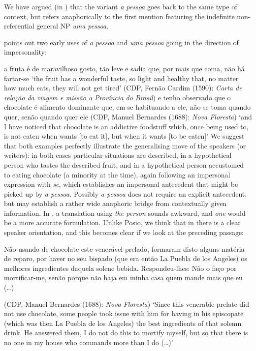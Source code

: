 \documentclass[output=paper]{langscibook}
\begin{document}
{We have argued (in \citealt{AmaralMihatsch2019}) that the variant} {\textit{a pessoa}} {goes back to the same type of context, but refers anaphorically to the first mention featuring the indefinite non{}-referential general NP} {\textit{uma pessoa}}.

\citet{Posio2021} points out two early uses of \textit{a pessoa} and \textit{uma pessoa} going in the direction of impersonality:

\eanoraggedright\label{ex:amaral:15}
a fruta é de maravilhoso gosto, tão leve e sadia que, por mais que  coma, não há fartar-se
\glt  ‘the fruit has a wonderful taste, so light and healthy that, no matter how much   eats, they will not get tired’ 
(CDP, Fernão Cardim (1590): \textit{Carta de relação da viagem e missão a Província do Brasil})
\ex\label{ex:amaral:16}
e tenho observado que o chocolate é alimento dominante que, em se habituando a ele, não se toma quando  quer, senão quando quer ele
(CDP, Manuel Bernardes (1688): \textit{Nova Floresta}) 
\glt ‘and I have noticed that chocolate is an addictive foodstuff which, once being used to, is not eaten when   wants [to eat it], but when it wants [to be eaten]’
\z 
We suggest that both examples perfectly illustrate the generalising move of the speakers (or writers): in both cases particular situations are described, in  a hypothetical person who tastes the {described fruit, and in  a hypothetical person accustomed to eating chocolate (a minority at the time), again following an impersonal expression with}{ \textit{se}}{, which establishes an impersonal antecedent that might be picked up by} {\textit{a pessoa.} }{Possibly} {\textit{a pessoa}} {does not require an explicit antecedent, but may establish a rather wide anaphoric bridge from contextually given information. In , a translation using} {\textit{the person}} {sounds awkward, and} {\textit{one}} {would be a more accurate formulation. Unlike Posio, we think that in  there is a clear speaker orientation, and this becomes clear if we look at the preceding passage:}



\eanoraggedright\label{ex:amaral:17}
\begin{otherlanguage}{portuguese}
Não usando de chocolate este venerável prelado, formaram disto alguns matéria de reparo, por haver no seu bispado (que era então La Puebla de los Angeles) os melhores ingredientes daquela solene bebida. Respondeu-lhes: Não o faço por mortificar-me, senão porque não haja em minha casa quem mande mais que eu (…)
\end{otherlanguage}
{(CDP, Manuel Bernardes (1688):} {\textit{Nova Floresta}})
\glt ‘Since this venerable prelate did not use chocolate, some people took issue with him for having in his episcopate (which was then La Puebla de los Angeles) the best ingredients of that solemn drink. He answered them, I do not do this to mortify myself, but so that there is no one in my house who commands more than I do (…)’
\z 
\end{document}
